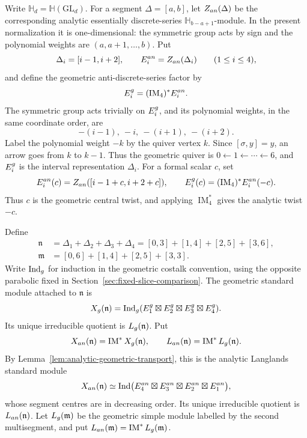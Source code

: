 \documentclass[10pt,a4paper]{amsart}
\newcommand{\Hh}{\mathbb H}
\begin{document}
Write $\Hh_d=\Hh(\mathrm{GL}_d)$.  For a segment
$\Delta=[a,b]$, let $Z_{\rm an}(\Delta)$ be the corresponding analytic
essentially discrete-series $\Hh_{b-a+1}$-module.  In the present
normalization it is one-dimensional: the symmetric group acts by sign and
the polynomial weights are $(a,a+1,\ldots,b)$.  Put
\[
 \Delta_i=[i-1,i+2],\qquad
 E_i^{\rm an}=Z_{\rm an}(\Delta_i)\qquad(1\leq i\leq4),
\]
and define the geometric anti-discrete-series factor by
\[
 E_i^{\rm g}=(\operatorname{IM}_4)^*E_i^{\rm an}.
\]
The symmetric group acts trivially on $E_i^{\rm g}$, and its polynomial
weights, in the same coordinate order, are
\[
 -(i-1),\ -i,\ -(i+1),\ -(i+2).
\]
Label the polynomial weight $-k$ by the quiver vertex $k$.
Since $[\sigma,y]=y$, an arrow goes from $k$ to $k-1$.
Thus the geometric quiver is $0\leftarrow1\leftarrow\cdots\leftarrow6$,
and $E_i^{\rm g}$ is the interval representation $\Delta_i$.
For a formal scalar $c$, set
\[
 E_i^{\rm an}(c)=Z_{\rm an}([i-1+c,i+2+c]),
 \qquad
 E_i^{\rm g}(c)=(\operatorname{IM}_4)^*E_i^{\rm an}(-c).
\]
Thus $c$ is the geometric central twist, and applying
$\operatorname{IM}_4^*$ gives the analytic twist $-c$.

Define
\begin{align*}
 \mathfrak n&=\Delta_1+\Delta_2+\Delta_3+\Delta_4
 =[0,3]+[1,4]+[2,5]+[3,6],\\
 \mathfrak m&=[0,6]+[1,4]+[2,5]+[3,3].
\end{align*}
Write $\operatorname{Ind}_{\rm g}$ for induction in the geometric costalk
convention, using the opposite parabolic fixed in
Section~\ref{sec:fixed-slice-comparison}.  The geometric standard module
attached to $\mathfrak n$ is
\begin{equation}\label{eq:appendix-standard-module}
 X_{\rm g}(\mathfrak n)
 =\operatorname{Ind}_{\rm g}
   (E_1^{\rm g}\boxtimes E_2^{\rm g}\boxtimes
    E_3^{\rm g}\boxtimes E_4^{\rm g}).
\end{equation}
Its unique irreducible quotient is $L_{\rm g}(\mathfrak n)$.  Put
\[
 X_{\rm an}(\mathfrak n)=\operatorname{IM}^*X_{\rm g}(\mathfrak n),
 \qquad
 L_{\rm an}(\mathfrak n)=\operatorname{IM}^*L_{\rm g}(\mathfrak n).
\]
By Lemma~\ref{lem:analytic-geometric-transport}, this is the analytic
Langlands standard module
\[
 X_{\rm an}(\mathfrak n)
 \simeq\operatorname{Ind}
 \bigl(E_4^{\rm an}\boxtimes E_3^{\rm an}\boxtimes
       E_2^{\rm an}\boxtimes E_1^{\rm an}\bigr),
\]
whose segment centres are in decreasing order.  Its unique irreducible
quotient is $L_{\rm an}(\mathfrak n)$.  Let
$L_{\rm g}(\mathfrak m)$ be the geometric simple module labelled by the
second multisegment, and put
$L_{\rm an}(\mathfrak m)=\operatorname{IM}^*L_{\rm g}(\mathfrak m)$.
\end{document}

